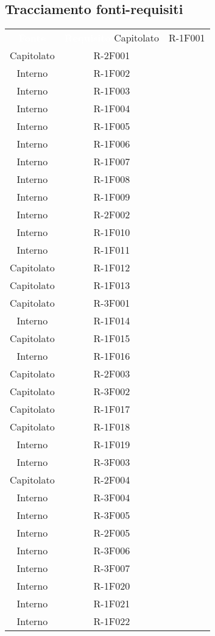 \subsection{Tracciamento fonti-requisiti} 
\begin{tabularx}{\textwidth}{c|c}
	
	\rowcolor{greySWEight}
	\textcolor{white}{\textbf{Fonte}} &
	\textcolor{white}{\textbf{Requisito}}\endhead
		Capitolato & R-1F001 \\
		Capitolato & R-2F001 \\
		Interno & R-1F002 \\
		Interno & R-1F003 \\
		Interno & R-1F004 \\
		Interno & R-1F005 \\
		Interno & R-1F006 \\
		Interno & R-1F007 \\
		Interno & R-1F008 \\
		Interno & R-1F009 \\
		Interno & R-2F002 \\
		Interno & R-1F010 \\
		Interno & R-1F011 \\
		Capitolato & R-1F012 \\
		Capitolato & R-1F013 \\
		Capitolato & R-3F001 \\
		Interno & R-1F014 \\
		Capitolato & R-1F015 \\
		Interno & R-1F016 \\
		Capitolato & R-2F003 \\
		Capitolato & R-3F002 \\
		Capitolato & R-1F017 \\
		Capitolato & R-1F018 \\
		Interno & R-1F019 \\
		Interno & R-3F003 \\
		Capitolato & R-2F004 \\
		Interno & R-3F004 \\
		Interno & R-3F005 \\
		Interno & R-2F005 \\
		Interno & R-3F006 \\
		Interno & R-3F007 \\
		Interno & R-1F020 \\
		Interno & R-1F021 \\
		Interno & R-1F022 \\

\end{tabularx}
